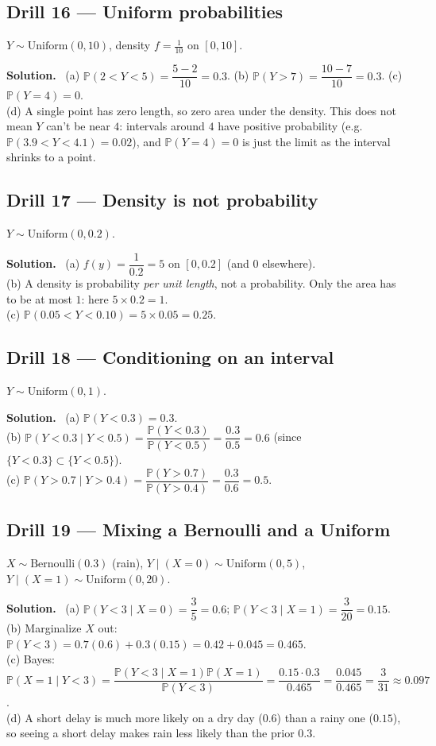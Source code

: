 \documentclass[11pt]{article}
\renewcommand{\P}{\mathbb{P}}
\newcommand{\Bern}{\text{Bernoulli}}
\newcommand{\Unif}{\text{Uniform}}
\newenvironment{soln}{\par\smallskip\noindent\textbf{Solution.}\ }{\par\medskip}
\begin{document}
\subsection*{Drill 16 --- Uniform probabilities}
$Y\sim\Unif(0,10)$, density $f=\frac1{10}$ on $[0,10]$.
\begin{soln}
(a) $\P(2<Y<5)=\dfrac{5-2}{10}=0.3$. \quad (b) $\P(Y>7)=\dfrac{10-7}{10}=0.3$. \quad (c) $\P(Y=4)=0$.\\
(d) A single point has zero length, so zero area under the density. This does not mean $Y$ can't be near $4$: intervals around $4$ have positive probability (e.g.\ $\P(3.9<Y<4.1)=0.02$), and $\P(Y=4)=0$ is just the limit as the interval shrinks to a point.
\end{soln}

\subsection*{Drill 17 --- Density is not probability}
$Y\sim\Unif(0,0.2)$.
\begin{soln}
(a) $f(y)=\dfrac1{0.2}=5$ on $[0,0.2]$ (and $0$ elsewhere).\\
(b) A density is probability \emph{per unit length}, not a probability. Only the area has to be at most $1$: here $5\times0.2=1$.\\
(c) $\P(0.05<Y<0.10)=5\times0.05=0.25$.
\end{soln}

\subsection*{Drill 18 --- Conditioning on an interval}
$Y\sim\Unif(0,1)$.
\begin{soln}
(a) $\P(Y<0.3)=0.3$.\\
(b) $\P(Y<0.3\mid Y<0.5)=\dfrac{\P(Y<0.3)}{\P(Y<0.5)}=\dfrac{0.3}{0.5}=0.6$ (since $\{Y<0.3\}\subset\{Y<0.5\}$).\\
(c) $\P(Y>0.7\mid Y>0.4)=\dfrac{\P(Y>0.7)}{\P(Y>0.4)}=\dfrac{0.3}{0.6}=0.5$.
\end{soln}

\subsection*{Drill 19 --- Mixing a Bernoulli and a Uniform}
$X\sim\Bern(0.3)$ (rain), $Y\mid(X{=}0)\sim\Unif(0,5)$, $Y\mid(X{=}1)\sim\Unif(0,20)$.
\begin{soln}
(a) $\P(Y<3\mid X{=}0)=\dfrac35=0.6$; \quad $\P(Y<3\mid X{=}1)=\dfrac3{20}=0.15$.\\
(b) Marginalize $X$ out: $\P(Y<3)=0.7(0.6)+0.3(0.15)=0.42+0.045=0.465$.\\
(c) Bayes: $\P(X{=}1\mid Y<3)=\dfrac{\P(Y<3\mid X{=}1)\P(X{=}1)}{\P(Y<3)}=\dfrac{0.15\cdot0.3}{0.465}=\dfrac{0.045}{0.465}=\dfrac3{31}\approx0.097$.\\
(d) A short delay is much more likely on a dry day ($0.6$) than a rainy one ($0.15$), so seeing a short delay makes rain less likely than the prior $0.3$.
\end{soln}
\end{document}

